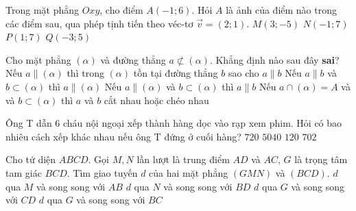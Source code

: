 \begin{ex}%
	Trong mặt phẳng $Oxy$, cho điểm $A(-1;6)$. Hỏi $A$ là ảnh của điểm nào trong các điểm sau, qua phép tịnh tiến theo véc-tơ $\vec{v}=(2;1)$.
	\choice
	{$M(3;-5)$}
	{$N(-1;7)$}
	{$P(1;7)$}
	{\True $Q(-3;5)$}
\end{ex}

\begin{ex}%
	Cho mặt phẳng $(\alpha)$ và đường thẳng $a\not\subset (\alpha)$. Khẳng định nào sau đây \textbf{sai}?
	\choice
	{Nếu $a\parallel (\alpha)$ thì trong $(\alpha)$ tồn tại đường thẳng $b$ sao cho $a\parallel b$}
	{Nếu $a\parallel b$ và $b\subset (\alpha)$ thì $a\parallel (\alpha)$}
	{\True Nếu $a\parallel (\alpha)$ và $b\subset (\alpha)$ thì $a\parallel b$}
	{Nếu $a\cap (\alpha)=A$ và và $b\subset (\alpha)$ thì $a$ và $b$ cắt nhau hoặc chéo nhau}
	\loigiai{
		
	}
\end{ex}

\begin{ex}%
	Ông T dẫn $6$ cháu nội ngoại xếp thành hàng dọc vào rạp xem phim. Hỏi có bao nhiêu cách xếp khác nhau nếu ông T đứng ở cuối hàng?
	\choice
	{\True $720$}
	{$5040$}
	{$120$}
	{$702$}
\end{ex}

\begin{ex}%
	Cho tứ diện $ABCD$. Gọi $M,N$ lần lượt là trung điểm $AD$ và $AC$, $G$ là trọng tâm tam giác $BCD$. Tìm giao tuyến $d$ của hai mặt phẳng $(GMN)$ và $(BCD)$.
	\choice
	{$d$ qua $M$ và song song với $AB$}
	{$d$ qua $N$ và song song với $BD$}
	{\True  $d$ qua $G$ và song song với $CD$}
	{$d$ qua $G$ và song song với $BC$}
\end{ex}

